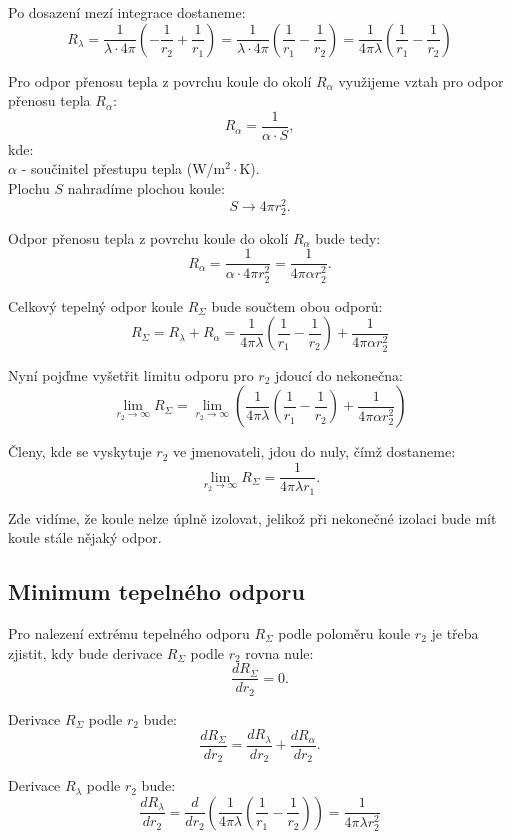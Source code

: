 \documentclass{article}
\begin{document}
Po dosazení mezí integrace dostaneme:
$$
    R_\lambda = \frac{1}{\lambda \cdot 4 \pi} \left( -\frac{1}{r_2} + \frac{1}{r_1} \right) = \frac{1}{\lambda \cdot 4 \pi} \left( \frac{1}{r_1} - \frac{1}{r_2} \right) = \frac{1}{4 \pi \lambda} \left( \frac{1}{r_1} - \frac{1}{r_2} \right)
$$

Pro odpor přenosu tepla z povrchu koule do okolí $R_{\alpha}$ využijeme vztah pro odpor přenosu tepla $R_{\alpha}$:
$$
    R_\alpha = \frac{1}{\alpha \cdot S},
$$
kde:\\
$\alpha$ - součinitel přestupu tepla (W/m$^2 \cdot$K).\\

Plochu $S$ nahradíme plochou koule:
$$
    S \rightarrow 4 \pi r_2^2.
$$

Odpor přenosu tepla z povrchu koule do okolí $R_\alpha$ bude tedy:
$$
    R_\alpha = \frac{1}{\alpha \cdot 4 \pi r_2^2} = \frac{1}{4 \pi \alpha r_2^2}.
$$

Celkový tepelný odpor koule $R_\Sigma$ bude součtem obou odporů:
$$
    R_\Sigma = R_{\lambda} + R_\alpha = \frac{1}{4 \pi \lambda} \left( \frac{1}{r_1} - \frac{1}{r_2} \right) + \frac{1}{4 \pi \alpha r_2^2}
$$

Nyní pojďme vyšetřit limitu odporu pro $r_2$ jdoucí do nekonečna:
$$
    \lim_{r_2 \to \infty} R_\Sigma = \lim_{r_2 \to \infty} \left( \frac{1}{4 \pi \lambda} \left( \frac{1}{r_1} - \frac{1}{r_2} \right) + \frac{1}{4 \pi \alpha r_2^2} \right)
$$

Členy, kde se vyskytuje $r_2$ ve jmenovateli, jdou do nuly, čímž dostaneme:
$$
    \lim_{r_2 \to \infty} R_\Sigma = \frac{1}{4 \pi \lambda r_1}.
$$

Zde vidíme, že koule nelze úplně izolovat, jelikož při nekonečné izolaci bude mít koule stále nějaký odpor.


\subsection{Minimum tepelného odporu}

Pro nalezení extrému tepelného odporu $R_\Sigma$ podle poloměru koule $r_2$ je třeba zjistit, kdy bude derivace $R_\Sigma$ podle $r_2$ rovna nule:
$$
    \frac{dR_\Sigma}{dr_2} = 0.
$$

Derivace $R_\Sigma$ podle $r_2$ bude:
$$
    \frac{dR_\Sigma}{dr_2} = \frac{dR_\lambda}{dr_2} + \frac{dR_\alpha}{dr_2}.
$$

Derivace $R_\lambda$ podle $r_2$ bude:
$$
    \frac{dR_\lambda}{dr_2} = \frac{d}{dr_2} \left( \frac{1}{4 \pi \lambda} \left( \frac{1}{r_1} - \frac{1}{r_2} \right) \right) = \frac{1}{4 \pi \lambda r_2^2}
$$
\end{document}
